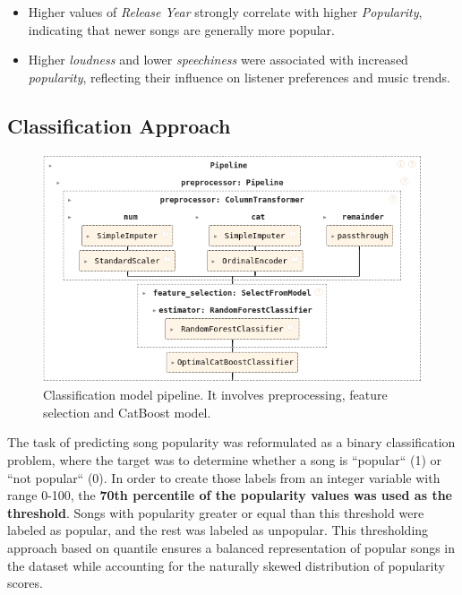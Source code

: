 \begin{itemize}
  \item Higher values of \textit{Release Year} strongly correlate with higher
    \textit{Popularity}, indicating that newer songs are generally more
    popular.
  \item Higher \textit{loudness} and lower \textit{speechiness}
    were associated with increased \textit{popularity}, reflecting their
    influence on listener preferences and music trends.
\end{itemize}



\subsection{Classification Approach}

\begin{center}
\begin{figure}[H]
  \centering
  \includegraphics[width=6in]{img/clf_pipeline.png}
  \caption{Classification model pipeline. It involves preprocessing, feature
  selection and CatBoost model.}
  \label{Figure:fig_beh}
\end{figure}
\end{center}

The task of predicting song popularity was reformulated as a binary
classification problem, where the target was to determine whether a song is
``popular`` (1) or ``not popular`` (0). In order to create those labels from an
integer variable with range 0-100, the \textbf{70th percentile of the
popularity values was used as the threshold}. Songs with popularity greater or
equal  than this  threshold were  labeled as popular, and the rest was labeled
as unpopular. This thresholding approach based on quantile ensures a balanced
representation of popular songs in the dataset while accounting for the
naturally skewed distribution of  popularity scores.

